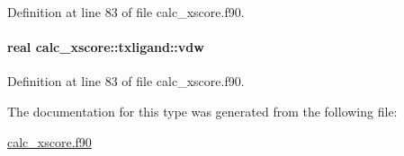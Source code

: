 Definition at line 83 of file calc\-\_\-xscore.\-f90.

\hypertarget{structcalc__xscore_1_1txligand_a27c9e7ab8634605bab80c1b5b35f17f1}{
\paragraph[{vdw}]{\setlength{\rightskip}{0pt plus 5cm}real calc\-\_\-xscore\-::txligand\-::vdw}}\label{structcalc__xscore_1_1txligand_a27c9e7ab8634605bab80c1b5b35f17f1}


Definition at line 83 of file calc\-\_\-xscore.\-f90.



The documentation for this type was generated from the following file\-:\begin{DoxyCompactItemize}
\item 
\hyperlink{calc__xscore_8f90}{calc\-\_\-xscore.\-f90}\end{DoxyCompactItemize}
